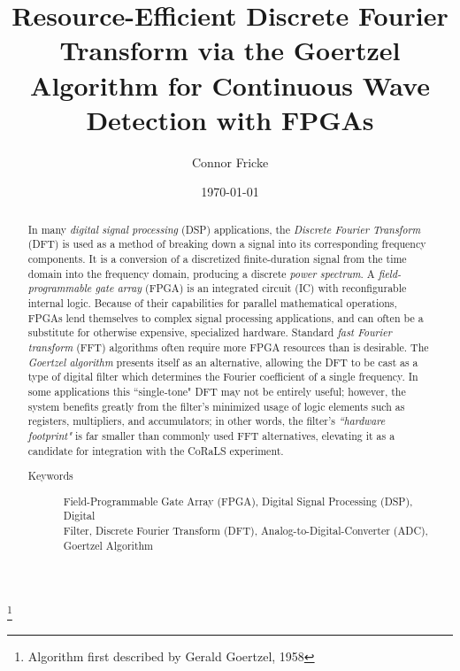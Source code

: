 \documentclass[reprint,amsmath,amssymb,aps,pra]{revtex4-2}
\begin{document}

\title{Resource-Efficient Discrete Fourier Transform via the Goertzel Algorithm for Continuous Wave Detection with FPGAs}
\thanks{Algorithm first described by Gerald Goertzel, 1958}%

\author{Connor Fricke}
%

 \noaffiliation

\date{\today}%

\begin{abstract}
In many \textit{digital signal processing} (DSP) applications, the \textit{Discrete Fourier Transform} (DFT) is used as a method of breaking down a signal into its corresponding frequency components. It is a conversion of a discretized finite-duration signal from the time domain into the frequency domain, producing a discrete \textit{power spectrum}. A \textit{field-programmable gate array} (FPGA) is an integrated circuit (IC) with reconfigurable internal logic. Because of their capabilities for parallel mathematical operations, FPGAs lend themselves to complex signal processing applications, and can often be a substitute for otherwise expensive, specialized hardware. Standard \textit{fast Fourier transform} (FFT) algorithms often require more FPGA resources than is desirable. The \textit{Goertzel algorithm} presents itself as an alternative, allowing the DFT to be cast as a type of digital filter which determines the Fourier coefficient of a single frequency. In some applications this ``single-tone" DFT may not be entirely useful; however, the system benefits greatly from the filter's minimized usage of logic elements such as registers, multipliers, and accumulators; in other words, the filter's \textit{``hardware footprint"} is far smaller than commonly used FFT alternatives, elevating it as a candidate for integration with the CoRaLS experiment.
\begin{description}
\item[Keywords]
Field-Programmable Gate Array (FPGA), Digital Signal Processing (DSP), Digital \\ Filter, Discrete Fourier Transform (DFT), Analog-to-Digital-Converter (ADC),
Goertzel Algorithm
\end{description}
\end{abstract}

\maketitle
\end{document}
